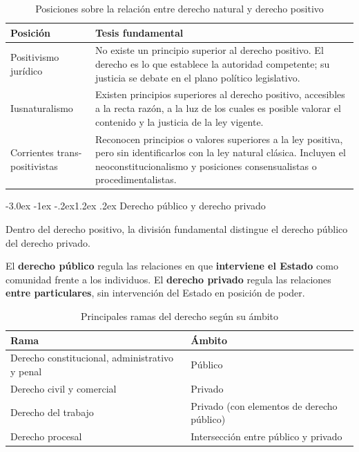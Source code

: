\documentclass[12pt,oneside]{book}
\makeatletter
\renewcommand\section{\@startsection{section}{1}{\z@}%
  {-3.0ex \@plus -1ex \@minus -.2ex}{1.2ex \@plus .2ex}%
  {\normalfont\large\bfseries\color{acento}}}
\makeatother
\begin{document}
\begin{table}[H]
\centering
\begin{tabularx}{\textwidth}{B{0.27\textwidth} Y}
\toprule
\textbf{Posición} & \textbf{Tesis fundamental} \\
\midrule
Positivismo jurídico & No existe un principio superior al derecho positivo. El derecho es lo que establece la autoridad competente; su justicia se debate en el plano político legislativo. \\
Iusnaturalismo & Existen principios superiores al derecho positivo, accesibles a la recta razón, a la luz de los cuales es posible valorar el contenido y la justicia de la ley vigente. \\
Corrientes trans-positivistas & Reconocen principios o valores superiores a la ley positiva, pero sin identificarlos con la ley natural clásica. Incluyen el neoconstitucionalismo y posiciones consensualistas o procedimentalistas. \\
\bottomrule
\end{tabularx}
\caption{Posiciones sobre la relación entre derecho natural y derecho positivo}
\end{table}

\section{Derecho público y derecho privado}

Dentro del derecho positivo, la división fundamental distingue el derecho público del derecho privado.

\begin{definicion}
El \textbf{derecho público} regula las relaciones en que \textbf{interviene el Estado} como comunidad frente a los individuos. El \textbf{derecho privado} regula las relaciones \textbf{entre particulares}, sin intervención del Estado en posición de poder.
\end{definicion}

\begin{table}[H]
\centering
\begin{tabularx}{\textwidth}{B{0.38\textwidth} Y}
\toprule
\textbf{Rama} & \textbf{Ámbito} \\
\midrule
Derecho constitucional, administrativo y penal & Público \\
Derecho civil y comercial & Privado \\
Derecho del trabajo & Privado (con elementos de derecho público) \\
Derecho procesal & Intersección entre público y privado \\
\bottomrule
\end{tabularx}
\caption{Principales ramas del derecho según su ámbito}
\end{table}
\end{document}
